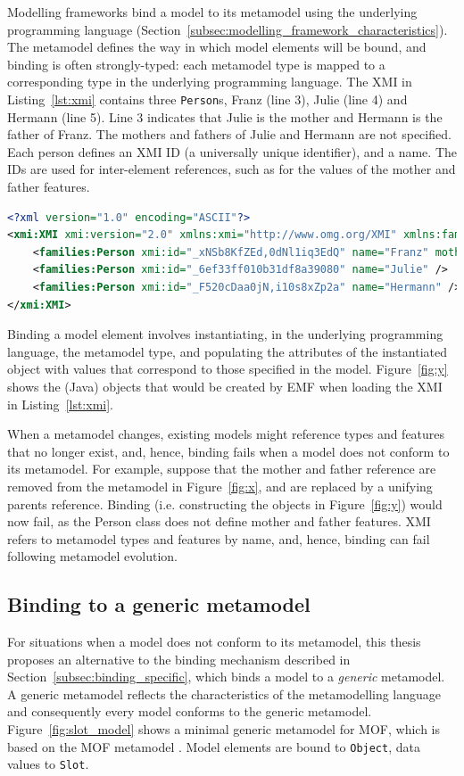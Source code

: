Modelling frameworks bind a model to its metamodel using the underlying programming language (Section~\ref{subsec:modelling_framework_characteristics}). The metamodel defines the way in which model elements will be bound, and binding is often strongly-typed: each metamodel type is mapped to a corresponding type in the underlying programming language. The XMI in Listing~\ref{lst:xmi} contains three \texttt{Person}s, Franz (line 3), Julie (line 4) and Hermann (line 5). Line 3 indicates that Julie is the mother and Hermann is the father of Franz. The mothers and fathers of Julie and Hermann are not specified. Each person defines an XMI ID (a universally unique identifier), and a name. The IDs are used for inter-element references, such as for the values of the mother and father features.

\begin{lstlisting}[caption=Person model in XMI, label=lst:xmi, language=XML]
<?xml version="1.0" encoding="ASCII"?>
<xmi:XMI xmi:version="2.0" xmlns:xmi="http://www.omg.org/XMI" xmlns:families="http://www.cs.york.ac.uk/families">
	<families:Person xmi:id="_xNSb8KfZEd,0dNl1iq3EdQ" name="Franz" mother="_6ef33ff010b31df8a39080" father="_F520cDaa0jN,i10s8xZp2a" />
	<families:Person xmi:id="_6ef33ff010b31df8a39080" name="Julie" />
	<families:Person xmi:id="_F520cDaa0jN,i10s8xZp2a" name="Hermann" />
</xmi:XMI>
\end{lstlisting}

Binding a model element involves instantiating, in the underlying programming language, the metamodel type, and populating the attributes of the instantiated object with values that correspond to those specified in the model. Figure~\ref{fig:y} shows the (Java) objects that would be created by EMF when loading the XMI in Listing~\ref{lst:xmi}.

When a metamodel changes, existing models might reference types and features that no longer exist, and, hence, binding fails when a model does not conform to its metamodel. For example, suppose that the mother and father reference are removed from the metamodel in Figure~\ref{fig:x}, and are replaced by a unifying parents reference. Binding (i.e. constructing the objects in Figure~\ref{fig:y}) would now fail, as the Person class does not define mother and father features. XMI refers to metamodel types and features by name, and, hence, binding can fail following metamodel evolution.

\subsection{Binding to a generic metamodel}
\label{subsec:binding}
For situations when a model does not conform to its metamodel, this thesis proposes an alternative to the binding mechanism described in Section~\ref{subsec:binding_specific}, which binds a model to a \emph{generic} metamodel. A generic metamodel reflects the characteristics of the metamodelling language and consequently every model conforms to the generic metamodel. Figure~\ref{fig:slot_model} shows a minimal generic metamodel for MOF, which is based on the MOF metamodel \cite{mof}. Model elements are bound to \texttt{Object}, data values to \texttt{Slot}.

